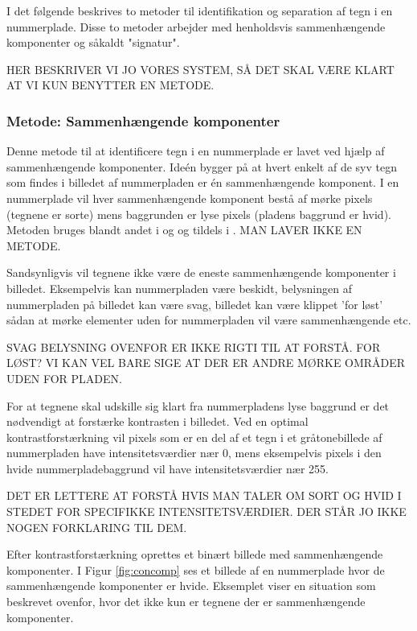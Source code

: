 

I det følgende beskrives to metoder til identifikation og separation af tegn i en nummerplade. Disse to metoder arbejder med henholdsvis sammenhængende komponenter og såkaldt "signatur".

HER BESKRIVER VI JO VORES SYSTEM, SÅ DET SKAL VÆRE KLART AT VI KUN BENYTTER EN METODE.
\subsubsection*{Metode: Sammenhængende komponenter}
Denne metode til at identificere tegn i en nummerplade er lavet ved hjælp af sammenhængende komponenter. Ideén bygger på at hvert enkelt af de syv tegn som findes i billedet af nummerpladen er én sammenhængende komponent. I en nummerplade vil hver sammenhængende komponent bestå af mørke pixels (tegnene er sorte) mens baggrunden er lyse pixels (pladens baggrund er hvid). Metoden bruges blandt andet i \cite{nijhuis} og \cite{parker} og tildels i \cite{kwas}.
MAN LAVER IKKE EN METODE.

Sandsynligvis vil tegnene ikke være de eneste sammenhængende komponenter i billedet. Eksempelvis kan nummerpladen være beskidt, belysningen af nummerpladen på billedet kan være svag, billedet kan være klippet 'for løst' sådan at mørke elementer uden for nummerpladen vil være sammenhængende etc.

SVAG BELYSNING OVENFOR ER IKKE RIGTI TIL AT FORSTÅ. FOR LØST? VI KAN VEL BARE SIGE AT DER ER ANDRE MØRKE OMRÅDER UDEN FOR PLADEN.

For at tegnene skal udskille sig klart fra nummerpladens lyse baggrund er det nødvendigt at forstærke kontrasten i billedet. Ved en optimal kontrastforstærkning vil pixels som er en del af et tegn i et gråtonebillede af nummerpladen have intensitetsværdier nær 0, mens eksempelvis pixels i den hvide nummerpladebaggrund vil have intensitetsværdier nær 255.

DET ER LETTERE AT FORSTÅ HVIS MAN TALER OM SORT OG HVID I STEDET FOR SPECIFIKKE INTENSITETSVÆRDIER. DER STÅR JO IKKE NOGEN FORKLARING TIL DEM.


Efter kontrastforstærkning oprettes et binært billede med sammenhængende komponenter. I Figur \vref{fig:concomp} ses et billede af en nummerplade hvor de sammenhængende komponenter er hvide. Eksemplet viser en situation som beskrevet ovenfor, hvor det ikke kun er tegnene der er sammenhængende komponenter.

